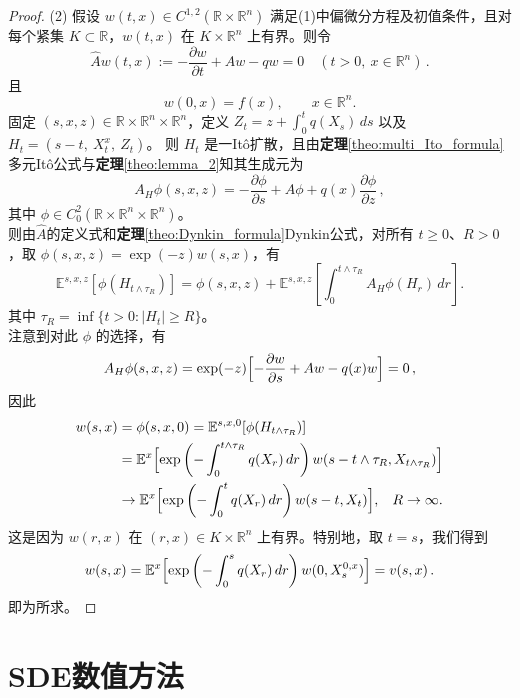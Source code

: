 \documentclass[oneside]{sysuthesis}
\begin{document}
\begin{proof}
	\noindent(2)
	假设 \( w(t, x) \in C^{1,2}(\mathbb{R} \times \mathbb{R}^n) \) 满足(1)中偏微分方程及初值条件，且对每个紧集 \( K \subset \mathbb{R} \)，\( w(t, x) \) 在 \( K \times \mathbb{R}^n \) 上有界。则令
	\[
	\widehat{A} w(t, x) := -\frac{\partial w}{\partial t} + A w - q w = 0 \quad (t > 0,\ x \in \mathbb{R}^n)\,.
	\]
	且
	\[
	w(0, x) = f(x),\qquad x \in \mathbb{R}^n.
	\]
	固定 \( (s, x, z) \in \mathbb{R} \times \mathbb{R}^n \times \mathbb{R}^n \)，定义  
	\( Z_t = z + \int_0^t q(X_s)\, ds \) 以及 \( H_t = (s - t,\ X_t^x,\ Z_t) \)。  
	则 \( H_t \) 是一It\^o扩散，且由\textbf{定理}\ref{theo:multi_Ito_formula}多元It\^o公式与\textbf{定理}\ref{theo:lemma_2}知其生成元为
	\[
	A_H \phi(s, x, z) = -\frac{\partial \phi}{\partial s} + A\phi + q(x) \frac{\partial \phi}{\partial z}\,,
	\]
	其中 \( \phi \in C_0^2(\mathbb{R} \times \mathbb{R}^n \times \mathbb{R}^n) \)。\\
	\hspace*{2em}则由$\widehat{A}$的定义式和\textbf{定理}\ref{theo:Dynkin_formula}Dynkin公式，对所有 \( t \geq 0 \)、\( R > 0 \)，取 \( \phi(s, x, z) = \exp(-z) w(s, x) \)，有
	\[
	\mathbb{E}^{s,x,z} [\phi(H_{t \wedge \tau_R})] = \phi(s, x, z) + \mathbb{E}^{s,x,z} \left[ \int_0^{t \wedge \tau_R} A_H \phi(H_r)\, dr \right].
	\]
	其中 \( \tau_R = \inf\{ t > 0 : |H_t| \geq R \} \)。\\
	\hspace*{2em}注意到对此 \( \phi \) 的选择，有
	\[
	A_H \phi(s, x, z) = \exp(-z) \Bigl[ -\frac{\partial w}{\partial s} + A w - q(x) w \Bigr] = 0\,,
	\]
	因此
	\[
	\begin{aligned}
		w(s, x) &= \phi(s, x, 0) = \mathbb{E}^{s,x,0} [\phi(H_{t \wedge \tau_R})]\\
		&= \mathbb{E}^x \Bigl[ \exp\left( -\int_0^{t \wedge \tau_R} q(X_r)\, dr \right) w(s - t \wedge \tau_R, X_{t \wedge \tau_R}) \Bigr]\\
		&\to \mathbb{E}^x \Bigl[ \exp\left( -\int_0^t q(X_r)\, dr \right) w(s - t, X_t) \Bigr],\hspace{0.3cm}R\to\infty.\\
	\end{aligned}
	\]
	这是因为 \( w(r, x) \) 在 \( (r, x) \in K \times \mathbb{R}^n \) 上有界。特别地，取 \( t = s \)，我们得到
	\[
	w(s, x) = \mathbb{E}^x \Bigl[ \exp\left( -\int_0^s q(X_r)\, dr \right) w(0, X_s^{0,x}) \Bigr] = v(s, x)\,.
	\]
	即为所求。
\end{proof}

\section{SDE数值方法}\label{sec:3.2}
\end{document}

